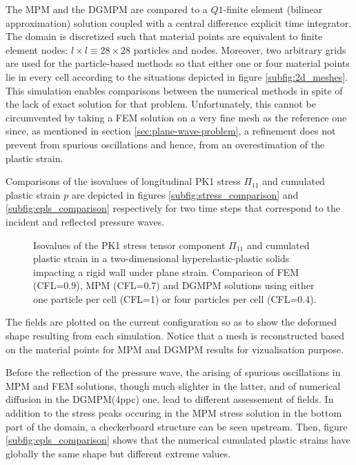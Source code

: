 The MPM and the DGMPM are compared to a $Q1$-finite element (bilinear approximation) solution coupled with a central difference explicit time integrator.
The domain is discretized such that material points are equivalent to finite element nodes: $l\times l \equiv 28 \times 28$ particles and nodes.
Moreover, two arbitrary grids are used for the particle-based methods so that either one or four material points lie in every cell according to the situations depicted in figure \ref{subfig:2d_meshes}.
This simulation enables comparisons between the numerical methods in spite of the lack of exact solution for that problem.
Unfortunately, this cannot be circumvented by taking a FEM solution on a very fine mesh as the reference one since, as mentioned in section \ref{sec:plane-wave-problem}, a refinement does not prevent from spurious oscillations and hence, from an overestimation of the plastic strain.



Comparisons of the isovalues of longitudinal PK1 stress $\Pi_{11}$ and cumulated plastic strain $p$ are depicted in figures \ref{subfig:stress_comparison} and \ref{subfig:epls_comparison} respectively for two time steps that correspond to the incident and reflected pressure waves.
\begin{figure}[ht]
  \centering
  \qquad
  \caption{Isovalues of the PK1 stress tensor component $\Pi_{11}$ and cumulated plastic strain in a two-dimensional hyperelastic-plastic solids impacting a rigid wall under plane strain. Comparison of FEM (CFL=0.9), MPM (CFL=0.7) and DGMPM solutions using either one particle per cell (CFL=1) or four particles per cell (CFL=0.4).}
  \label{fig:PS_taylor}
\end{figure}
The fields are plotted on the current configuration so as to show the deformed shape resulting from each simulation.
Notice that a mesh is reconstructed based on the material points for MPM and DGMPM results for vizualisation purpose.

Before the reflection of the pressure wave, the arising of spurious oscillations in MPM and FEM solutions, though much slighter in the latter, and of numerical diffusion in the DGMPM(4ppc) one, lead to different assessement of fields.
In addition to the stress peaks occuring in the MPM stress solution in the bottom part of the domain, a checkerboard structure can be seen upstream.
Then, figure \ref{subfig:epls_comparison} shows that the numerical cumulated plastic strains have globally the same shape but different extreme values.

